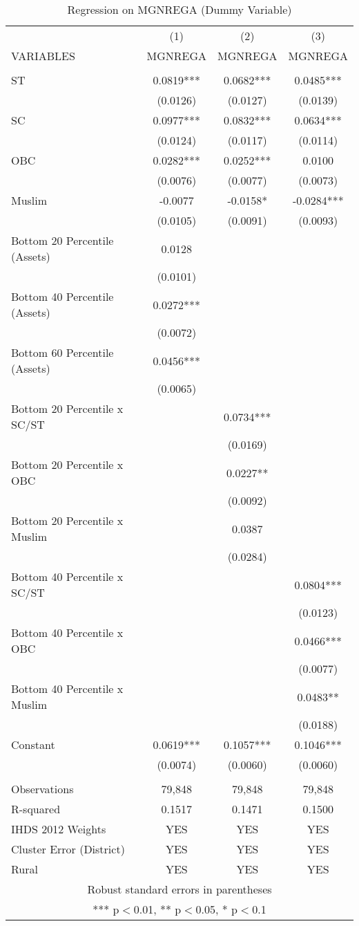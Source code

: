 \documentclass{article}
\begin{document}
\begin{table}[]
    \centering
    \begin{tabular}{lccc} \hline
 & (1) & (2) & (3) \\
VARIABLES & MGNREGA & MGNREGA & MGNREGA \\ \hline\hline
 &  &  &  \\
ST & 0.0819*** & 0.0682*** & 0.0485*** \\
 & (0.0126) & (0.0127) & (0.0139) \\
SC & 0.0977*** & 0.0832*** & 0.0634*** \\
 & (0.0124) & (0.0117) & (0.0114) \\
OBC & 0.0282*** & 0.0252*** & 0.0100 \\
 & (0.0076) & (0.0077) & (0.0073) \\
Muslim & -0.0077 & -0.0158* & -0.0284*** \\
 & (0.0105) & (0.0091) & (0.0093) \\
Bottom 20 Percentile (Assets) & 0.0128 &  &  \\
 & (0.0101) &  &  \\
Bottom 40 Percentile (Assets) & 0.0272*** &  &  \\
 & (0.0072) &  &  \\
Bottom 60 Percentile (Assets) & 0.0456*** &  &  \\
 & (0.0065) &  &  \\
Bottom 20 Percentile x SC/ST &  & 0.0734*** &  \\
 &  & (0.0169) &  \\
Bottom 20 Percentile x OBC &  & 0.0227** &  \\
 &  & (0.0092) &  \\
Bottom 20 Percentile x Muslim &  & 0.0387 &  \\
 &  & (0.0284) &  \\
Bottom 40 Percentile x SC/ST &  &  & 0.0804*** \\
 &  &  & (0.0123) \\
Bottom 40 Percentile x OBC &  &  & 0.0466*** \\
 &  &  & (0.0077) \\
Bottom 40 Percentile x Muslim &  &  & 0.0483** \\
 &  &  & (0.0188) \\
Constant & 0.0619*** & 0.1057*** & 0.1046*** \\
 & (0.0074) & (0.0060) & (0.0060) \\
 &  &  &  \\\hline
Observations & 79,848 & 79,848 & 79,848 \\
 R-squared & 0.1517 & 0.1471 & 0.1500 \\ 
 IHDS 2012 Weights & YES & YES & YES \\
Cluster Error (District) & YES & YES & YES \\
Rural & YES & YES & YES \\\hline
\multicolumn{4}{c}{ Robust standard errors in parentheses} \\
\multicolumn{4}{c}{ *** p$<$0.01, ** p$<$0.05, * p$<$0.1} \\\hline 
\end{tabular}
    \caption{Regression on MGNREGA (Dummy Variable)}
    \label{tab3}
\end{table}
\end{document}
